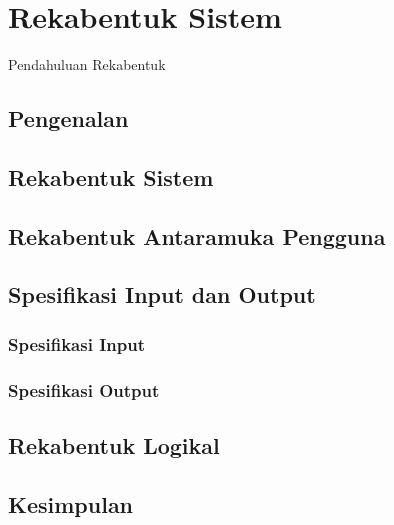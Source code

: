 \chapter{Rekabentuk Sistem}\label{c4}
Pendahuluan Rekabentuk

\section{Pengenalan}

\section{Rekabentuk Sistem}

\section{Rekabentuk Antaramuka Pengguna}
\section{Spesifikasi Input dan Output}
\subsection{Spesifikasi Input}
\subsection{Spesifikasi Output}
\section{Rekabentuk Logikal}
\section{Kesimpulan}


